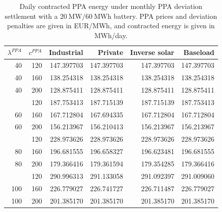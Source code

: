 \begin{table}[p]
\centering
\small
\caption{Daily contracted PPA energy under monthly PPA deviation settlement with a $20~\mathrm{MW}/60~\mathrm{MWh}$ battery. PPA prices and deviation penalties are given in EUR/MWh, and contracted energy is given in MWh/day.}
\label{tab:contracted-energy-monthly-p-20-e-60}
\begin{tabular*}{\textwidth}{@{\extracolsep{\fill}}rrrrrr@{}}
\toprule
$\lambda^{PPA}$ & $c^{PPA}$ & Industrial & Private & Inverse solar & Baseload \\
\midrule
40 & 120 & 147.397703 & 147.397703 & 147.397703 & 147.397703 \\
40 & 160 & 138.254318 & 138.254318 & 138.254318 & 138.254318 \\
40 & 200 & 128.875411 & 128.875411 & 128.875411 & 128.875411 \\
\addlinespace
60 & 120 & 187.753413 & 187.715139 & 187.715139 & 187.753413 \\
60 & 160 & 167.712804 & 167.694335 & 167.712804 & 167.712804 \\
60 & 200 & 156.213967 & 156.210413 & 156.213967 & 156.213967 \\
\addlinespace
80 & 120 & 228.973626 & 228.973626 & 228.973626 & 228.973626 \\
80 & 160 & 196.681555 & 196.658327 & 196.623481 & 196.681555 \\
80 & 200 & 179.366416 & 179.361594 & 179.354285 & 179.366416 \\
\addlinespace
100 & 120 & 290.996313 & 291.133058 & 291.092397 & 291.009060 \\
100 & 160 & 226.779027 & 226.741727 & 226.711487 & 226.779027 \\
100 & 200 & 201.385170 & 201.385170 & 201.385170 & 201.385170 \\
\bottomrule
\end{tabular*}
\end{table}


